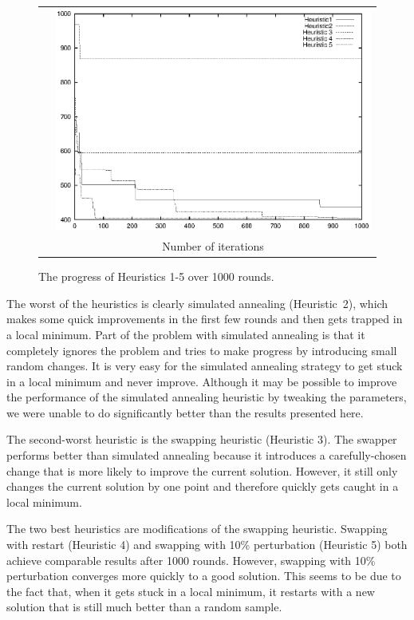 \documentclass{elsart}
\begin{document}
\begin{figure}
\begin{center}
\begin{tabular}{c@{}c}
\raisebox{5cm}{Error} & \includegraphics{iterative} \\
& Number of iterations
\end{tabular}
\end{center}
\caption{The progress of Heuristics 1-5 over 1000 rounds.}
\end{figure}

The worst of the heuristics is clearly simulated annealing
(Heuristic~2), which makes some quick improvements in the first few
rounds and then gets trapped in a local minimum.  Part of the problem
with simulated annealing is that it completely ignores the problem and
tries to make progress by introducing small random changes.  It is
very easy for the simulated annealing strategy to get stuck in a local
minimum and never improve.  Although it may be possible to improve the
performance of the simulated annealing heuristic by tweaking the
parameters, we were unable to do significantly better than the results
presented here.

The second-worst heuristic is the swapping heuristic (Heuristic 3).
The swapper performs better than simulated annealing because it
introduces a carefully-chosen change that is more likely to improve
the current solution. However, it still only changes the current
solution by one point and therefore quickly gets caught in a local
minimum.

The two best heuristics are modifications of the swapping heuristic.
Swapping with restart (Heuristic 4) and swapping with 10\%
perturbation (Heuristic 5) both achieve comparable results after 1000
rounds. However, swapping with 10\% perturbation converges more
quickly to a good solution.  This seems to be due to the fact that,
when it gets stuck in a local minimum, it restarts with a new solution
that is still much better than a random sample.
\end{document}

